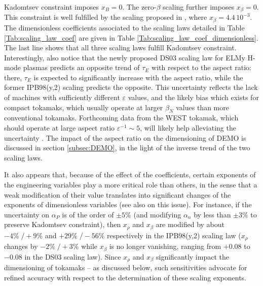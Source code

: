 \documentclass[12pt]{iopart}
\begin{document}
Kadomtsev constraint imposes $x_B=0$. The zero-$\beta$ scaling further imposes $x_\beta = 0$. This constraint is well fulfilled by the scaling proposed in \cite{Sips2018}, where $x_\beta = 4.4\, 10^{-3}$. The dimensionless coefficients associated to the scaling laws detailed in Table \ref{Tab:scaling_law_coef} are given in Table \ref{Tab:scaling_law_coef_dimensionless}. The last line shows that all three scaling laws fulfill Kadomtsev constraint. Interestingly, also notice that the newly proposed DS03 scaling law for ELMy H-mode plasmas predicts an opposite trend of $\tau_E$ with respect to the aspect ratio: there, $\tau_E$ is expected to significantly increase with the aspect ratio, while the former IPB98(y,2) scaling predicts the opposite. This uncertainty reflects the lack of machines with sufficiently different $\varepsilon$ values, and the likely bias which exists for compact tokamaks, which usually operate at larger $\beta_N$ values than more conventional tokamaks. Forthcoming data from the WEST tokamak, which should operate at large aspect ratio $\varepsilon^{-1} \sim 5$, will likely help alleviating the uncertainty \cite{Bucalossi2011}. The impact of the aspect ratio on the dimensioning of DEMO is discussed in section \ref{subsec:DEMO}, in the light of the inverse trend of the two scaling laws.

It also appears that, because of the effect of the coefficients, certain exponents of the engineering variables play a more critical role than others, in the sense that a weak modification of their value translates into significant changes of the  exponents of dimensionless variables (see also \cite{Ghendrih2014} on this issue). For instance, if the uncertainty on $\alpha_P$ is of the order of $\pm5\%$ (and modifying $\alpha_n$ by less than $\pm3\%$ to preserve Kadomtsev constraint), then $x_\rho$ and $x_\beta$ are modified by about $-4\% \;/ +9\%$ and $+29\% \;/ -56\%$ respectively in the IPB98(y,2) scaling law ($x_\rho$ changes by $-2\% \;/ +3\%$ while $x_\beta$ is no longer vanishing, ranging from $+0.08$ to $-0.08$ in the DS03 scaling law). Since $x_\rho$ and $x_\beta$ significantly impact the dimensioning of tokamaks -- as discussed below, such sensitivities advocate for refined accuracy with respect to the determination of these scaling exponents. \\
\end{document}
